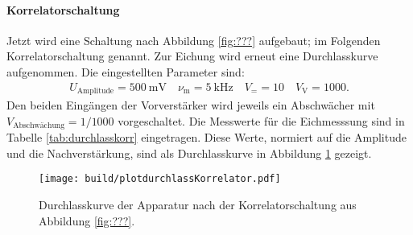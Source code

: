 \paragraph{Korrelatorschaltung}

Jetzt wird eine Schaltung nach Abbildung \ref{fig:???} aufgebaut; im Folgenden Korrelatorschaltung genannt. Zur Eichung wird erneut eine Durchlasskurve aufgenommen. Die eingestellten Parameter sind:
\begin{align*}
  U_\text{Amplitude} = \SI{500}{\milli\volt} \quad \nu_\text{m} = \SI{5}{\kilo\hertz}\quad V_= = 10 \quad V_\text{V} = 1000.
\end{align*}
Den beiden Eingängen der Vorverstärker wird jeweils ein Abschwächer mit $V_\text{Abschwächung} = 1/1000$ vorgeschaltet.
Die Messwerte für die Eichmesssung sind in Tabelle \ref{tab:durchlasskorr} eingetragen.
Diese Werte, normiert auf die Amplitude und die Nachverstärkung, sind als Durchlasskurve in Abbildung \ref{fig:plotdurchlasskorr} gezeigt.
\begin{figure}
  \centering
  \texttt{[image: build/plotdurchlassKorrelator.pdf]}
  \caption{Durchlasskurve der Apparatur nach der Korrelatorschaltung aus Abbildung \ref{fig:???}.}
  \label{fig:plotdurchlasskorr}
\end{figure}

